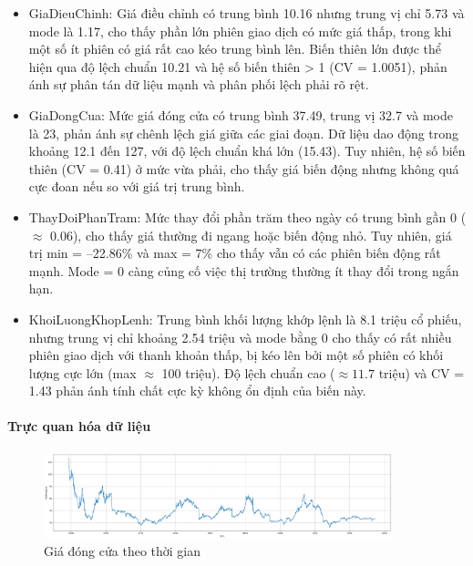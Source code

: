     \begin{itemize}
    \item GiaDieuChinh:  Giá điều chỉnh có trung bình 10.16 nhưng trung vị chỉ 5.73 và mode là 1.17, cho thấy phần lớn phiên giao dịch có mức giá thấp, trong khi một số ít phiên có giá rất cao kéo trung bình lên. Biến thiên lớn được thể hiện qua độ lệch chuẩn 10.21 và hệ số biến thiên > 1 (CV = 1.0051), phản ánh sự phân tán dữ liệu mạnh và phân phối lệch phải rõ rệt.
    
    \item GiaDongCua: Mức giá đóng cửa có trung bình 37.49, trung vị 32.7 và mode là 23, phản ánh sự chênh lệch giá giữa các giai đoạn. Dữ liệu dao động trong khoảng 12.1 đến 127, với độ lệch chuẩn khá lớn (15.43). Tuy nhiên, hệ số biến thiên (CV = 0.41) ở mức vừa phải, cho thấy giá biến động nhưng không quá cực đoan nếu so với giá trị trung bình.
    
    \item ThayDoiPhanTram: Mức thay đổi phần trăm theo ngày có trung bình gần 0 ($\approx$ 0.06), cho thấy giá thường đi ngang hoặc biến động nhỏ. Tuy nhiên, giá trị min = –22.86\% và max = 7\% cho thấy vẫn có các phiên biến động rất mạnh. Mode = 0 càng củng cố việc thị trường thường ít thay đổi trong ngắn hạn.
    
    \item KhoiLuongKhopLenh:
    Trung bình khối lượng khớp lệnh là 8.1 triệu cổ phiếu, nhưng trung vị chỉ khoảng 2.54 triệu và mode bằng 0 cho thấy có rất nhiều phiên giao dịch với thanh khoản thấp, bị kéo lên bởi một số phiên có khối lượng cực lớn (max $\approx$ 100 triệu). Độ lệch chuẩn cao ($\approx 11.7$ triệu) và CV = 1.43 phản ánh tính chất cực kỳ không ổn định của biến này.
    
    \end{itemize}

    \paragraph{Trực quan hóa dữ liệu}
    \leavevmode

    \begin{figure}[htp]
        \centering
        \includegraphics[width=0.90\textwidth]{images/TS_stock_close.png}
        \caption{Giá đóng cửa theo thời gian}
        \label{fig:TS_stock_close}
    \end{figure}
    \FloatBarrier

